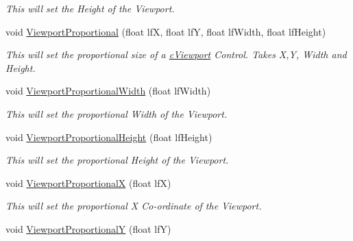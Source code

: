 \begin{DoxyCompactItemize}
\begin{DoxyCompactList}\small\item\em This will set the Height of the Viewport. \end{DoxyCompactList}\item 
\hypertarget{classc_viewport_control_a1ded5812151e520acd7a59ee54c2da18}{
void \hyperlink{classc_viewport_control_a1ded5812151e520acd7a59ee54c2da18}{ViewportProportional} (float lfX, float lfY, float lfWidth, float lfHeight)}
\label{classc_viewport_control_a1ded5812151e520acd7a59ee54c2da18}

\begin{DoxyCompactList}\small\item\em This will set the proportional size of a \hyperlink{classc_viewport}{cViewport} Control. Takes X,Y, Width and Height. \end{DoxyCompactList}\item 
\hypertarget{classc_viewport_control_a737b80cd951fb7788515246e73c6efcb}{
void \hyperlink{classc_viewport_control_a737b80cd951fb7788515246e73c6efcb}{ViewportProportionalWidth} (float lfWidth)}
\label{classc_viewport_control_a737b80cd951fb7788515246e73c6efcb}

\begin{DoxyCompactList}\small\item\em This will set the proportional Width of the Viewport. \end{DoxyCompactList}\item 
\hypertarget{classc_viewport_control_a127824d41e7d79d9ac9f29fdd5ff9191}{
void \hyperlink{classc_viewport_control_a127824d41e7d79d9ac9f29fdd5ff9191}{ViewportProportionalHeight} (float lfHeight)}
\label{classc_viewport_control_a127824d41e7d79d9ac9f29fdd5ff9191}

\begin{DoxyCompactList}\small\item\em This will set the proportional Height of the Viewport. \end{DoxyCompactList}\item 
\hypertarget{classc_viewport_control_aebe75df4d8a302de7b74ec96021246bd}{
void \hyperlink{classc_viewport_control_aebe75df4d8a302de7b74ec96021246bd}{ViewportProportionalX} (float lfX)}
\label{classc_viewport_control_aebe75df4d8a302de7b74ec96021246bd}

\begin{DoxyCompactList}\small\item\em This will set the proportional X Co-\/ordinate of the Viewport. \end{DoxyCompactList}\item 
\hypertarget{classc_viewport_control_a6c375e235aaf3fb405311ec5871b8a36}{
void \hyperlink{classc_viewport_control_a6c375e235aaf3fb405311ec5871b8a36}{ViewportProportionalY} (float lfY)}
\label{classc_viewport_control_a6c375e235aaf3fb405311ec5871b8a36}


\end{DoxyCompactItemize}
